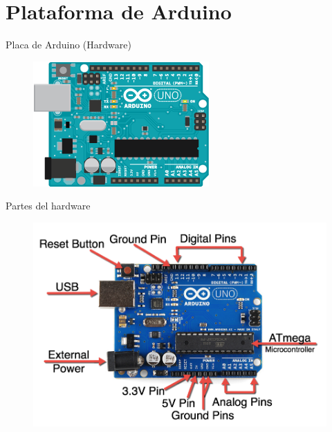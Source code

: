 \documentclass{beamer}
\begin{document}
	\section{Plataforma de Arduino}
	
	\begin{frame}{Placa de Arduino (Hardware)}
		\begin{figure}
			\centering
			\includegraphics[scale=0.55]{ardu}
		\end{figure}
	\end{frame}
	
	\begin{frame}{Partes del hardware}
		\begin{figure}
			\centering
			\includegraphics[scale=0.55]{arduinoparts}
		\end{figure}
	\end{frame}
	
\end{document}
